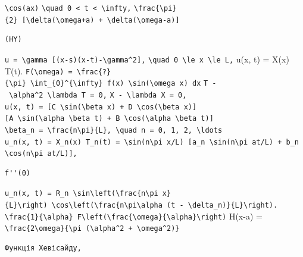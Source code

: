 \documentclass[
  ukrainian,
]{article}
\begin{document}
\texttt{\textbackslash{}cos(ax)}
\texttt{\textbackslash{}quad\ 0\ \textless{}\ t\ \textless{}\ \textbackslash{}infty,}
\texttt{\textbackslash{}frac\{\textbackslash{}pi\}\{2\}\ {[}\textbackslash{}delta(\textbackslash{}omega+a)\ +\ \textbackslash{}delta(\textbackslash{}omega-a){]}}

\begin{verbatim}
(HY)
\end{verbatim}

\texttt{u\ =\ \textbackslash{}gamma\ {[}(x-s)(x-t)-\textbackslash{}gamma\^{}2{]},}
\texttt{\textbackslash{}quad\ 0\ \textbackslash{}le\ x\ \textbackslash{}le\ L,}
u(x, t) = X(x) T(t).
\texttt{F(\textbackslash{}omega)\ =\ \textbackslash{}frac\{?\}\{\textbackslash{}pi\}\ \textbackslash{}int\_\{0\}\^{}\{\textbackslash{}infty\}\ f(x)\ \textbackslash{}sin(\textbackslash{}omega\ x)\ dx}
\texttt{T\textquotesingle{}\textquotesingle{}\ -\ \textbackslash{}alpha\^{}2\ \textbackslash{}lambda\ T\ =\ 0,}
\texttt{X\textquotesingle{}\textquotesingle{}\ -\ \textbackslash{}lambda\ X\ =\ 0,}
\texttt{u(x,\ t)\ =\ {[}C\ \textbackslash{}sin(\textbackslash{}beta\ x)\ +\ D\ \textbackslash{}cos(\textbackslash{}beta\ x){]}{[}A\ \textbackslash{}sin(\textbackslash{}alpha\ \textbackslash{}beta\ t)\ +\ B\ \textbackslash{}cos(\textbackslash{}alpha\ \textbackslash{}beta\ t){]}}
\texttt{\textbackslash{}beta\_n\ =\ \textbackslash{}frac\{n\textbackslash{}pi\}\{L\},\ \textbackslash{}quad\ n\ =\ 0,\ 1,\ 2,\ \textbackslash{}ldots}
\texttt{u\_n(x,\ t)\ =\ X\_n(x)\ T\_n(t)\ =\ \textbackslash{}sin(n\textbackslash{}pi\ x/L)\ {[}a\_n\ \textbackslash{}sin(n\textbackslash{}pi\ at/L)\ +\ b\_n\ \textbackslash{}cos(n\textbackslash{}pi\ at/L){]},}

\begin{verbatim}
f''(0)
\end{verbatim}

\texttt{u\_n(x,\ t)\ =\ R\_n\ \textbackslash{}sin\textbackslash{}left(\textbackslash{}frac\{n\textbackslash{}pi\ x\}\{L\}\textbackslash{}right)\ \textbackslash{}cos\textbackslash{}left(\textbackslash{}frac\{n\textbackslash{}pi\textbackslash{}alpha\ (t\ -\ \textbackslash{}delta\_n)\}\{L\}\textbackslash{}right).}
\texttt{\textbackslash{}frac\{1\}\{\textbackslash{}alpha\}\ F\textbackslash{}left(\textbackslash{}frac\{\textbackslash{}omega\}\{\textbackslash{}alpha\}\textbackslash{}right)}
H(x-a) =
\texttt{\textbackslash{}frac\{2\textbackslash{}omega\}\{\textbackslash{}pi\ (\textbackslash{}alpha\^{}2\ +\ \textbackslash{}omega\^{}2)\}}

\begin{verbatim}
Функція Хевісайду,
\end{verbatim}
\end{document}
